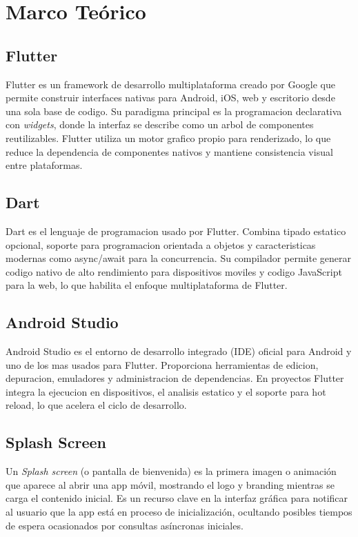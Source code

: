 \documentclass[12pt, a4paper]{article}
\begin{document}
\section{Marco Teórico}

\subsection{Flutter}
Flutter es un framework de desarrollo multiplataforma creado por Google que permite construir interfaces nativas para Android, iOS, web y escritorio desde una sola base de codigo. Su paradigma principal es la programacion declarativa con \textit{widgets}, donde la interfaz se describe como un arbol de componentes reutilizables. Flutter utiliza un motor grafico propio para renderizado, lo que reduce la dependencia de componentes nativos y mantiene consistencia visual entre plataformas.

\subsection{Dart}
Dart es el lenguaje de programacion usado por Flutter. Combina tipado estatico opcional, soporte para programacion orientada a objetos y caracteristicas modernas como async/await para la concurrencia. Su compilador permite generar codigo nativo de alto rendimiento para dispositivos moviles y codigo JavaScript para la web, lo que habilita el enfoque multiplataforma de Flutter.

\subsection{Android Studio}
Android Studio es el entorno de desarrollo integrado (IDE) oficial para Android y uno de los mas usados para Flutter. Proporciona herramientas de edicion, depuracion, emuladores y administracion de dependencias. En proyectos Flutter integra la ejecucion en dispositivos, el analisis estatico y el soporte para hot reload, lo que acelera el ciclo de desarrollo.

\subsection{Splash Screen}
Un \textit{Splash screen} (o pantalla de bienvenida) es la primera imagen o animación que aparece al abrir una app móvil, mostrando el logo y branding mientras se carga el contenido inicial. Es un recurso clave en la interfaz gráfica para notificar al usuario que la app está en proceso de inicialización, ocultando posibles tiempos de espera ocasionados por consultas asíncronas iniciales.
\end{document}
